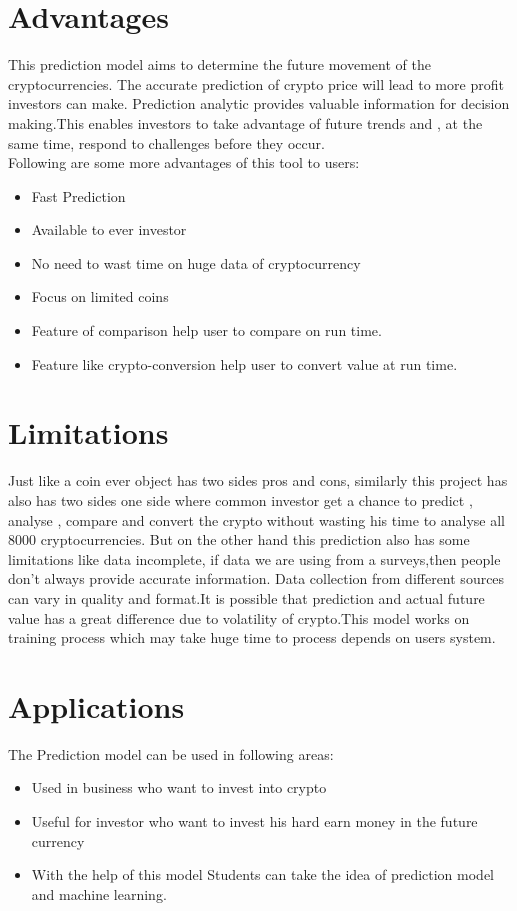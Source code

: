 \documentclass[openany,12pt]{report}
\begin{document}
{{{{{\section{Advantages}
This prediction model aims to determine the future movement of the cryptocurrencies. The accurate prediction of crypto price will lead to more profit investors can make.
Prediction analytic provides valuable information for decision making.This enables investors to take advantage of future trends and , at the same time, respond to challenges before they occur.
\\Following are some more advantages of this tool to users:
\begin{itemize}
\item{{Fast Prediction}}
\item{{Available to ever investor}}
\item{{No need to wast time on huge data of cryptocurrency}}
\item{{Focus on limited coins}}
\item{{Feature of comparison help user to compare on run time.}}
\item{{Feature like crypto-conversion help user to convert value at run time.}}
\end{itemize}

\section{Limitations}
Just like a coin ever object has two sides pros and cons, similarly this project has also has two sides one side where common investor get a chance to predict , analyse , compare and convert the crypto without wasting his time to analyse all 8000 cryptocurrencies.
But on the other hand this prediction also has some limitations like data incomplete, if data we are using from a surveys,then people don't always provide accurate information. Data collection from different sources can vary in quality and format.It is possible that prediction and actual future value has a great difference due to volatility of crypto.This model works on training process which may take huge time to process depends on users system.

\section{Applications}
The Prediction model can be used in following areas:
\begin{itemize}
\item{Used in business who want to invest into crypto}
\item{Useful for investor who want to invest his hard earn money in the future currency }
\item{With the help of this model Students can take the idea of prediction model and machine learning.}
\end{itemize}
}}}}}
\end{document}
